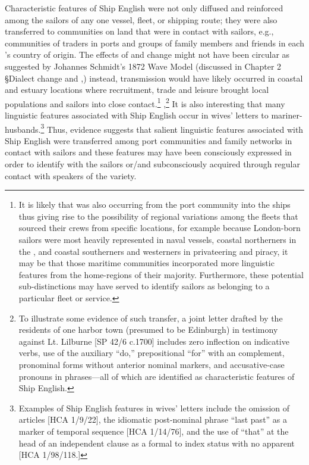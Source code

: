 Characteristic features of Ship English were not only diffused and reinforced among the sailors of any one vessel, fleet, or shipping route; they were also transferred to communities on land that were in contact with sailors, e.g., communities of traders in ports and groups of family members and friends in each ’s country of origin. The effects of  and change might not have been circular as suggested by Johannes Schmidt’s 1872 Wave Model (discussed in Chapter 2 §Dialect change and ,)  instead, transmission would have likely occurred in coastal and estuary locations where recruitment, trade and leisure brought local populations and sailors into close contact.\footnote{It is likely that  was also occurring from the port community into the ships thus giving rise to the possibility of regional variations among the fleets that sourced their crews from specific locations, for example because London{}-born sailors were most heavily represented in naval vessels, coastal northerners in the , and coastal southerners and westerners in privateering and piracy, it may be that those maritime communities incorporated more linguistic features from the home-regions of their  majority. Furthermore, these potential sub-distinctions may have served to identify sailors as belonging to a particular fleet or service.} ,\footnote{To illustrate some evidence of such transfer, a joint letter drafted by the residents of one harbor town (presumed to be Edinburgh) in testimony against Lt. Lilburne [SP 42/6 c.1700] includes zero inflection on  indicative verbs,  use of the auxiliary “do,” prepositional “for” with an  complement,  pronominal forms without anterior nominal markers, and accusative-case pronouns in  phrases—all of which are identified as characteristic features of Ship English.} It is also interesting that many linguistic features associated with Ship English occur in wives’ letters to mariner-husbands.\footnote{Examples of Ship English features in wives’ letters include the omission of articles [HCA 1/9/22], the idiomatic post-nominal phrase “last past” as a marker of temporal sequence [HCA 1/14/76], and the use of “that” at the head of an independent clause as a formal  to index status with no apparent  [HCA 1/98/118.]} Thus, evidence suggests that salient linguistic features associated with Ship English were transferred among port communities and family networks in contact with sailors and these features may have been consciously expressed in order to identify with the sailors or/and subconsciously acquired through regular contact with speakers of the variety.  

